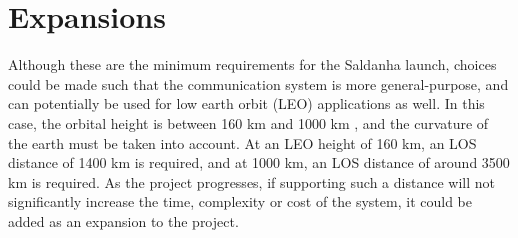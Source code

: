 \section{Expansions}

Although these are the minimum requirements for the Saldanha launch, choices could be made such that the communication system is more general-purpose, and can potentially be used for low earth orbit (LEO) applications as well. In this case, the orbital height is between 160 km and 1000 km \cite{esaTypesOrbits}, and the curvature of the earth must be taken into account. At an LEO height of 160 km, an LOS distance of 1400 km is required, and at 1000 km, an LOS distance of around 3500 km is required. As the project progresses, if supporting such a distance will not significantly increase the time, complexity or cost of the system, it could be added as an expansion to the project.